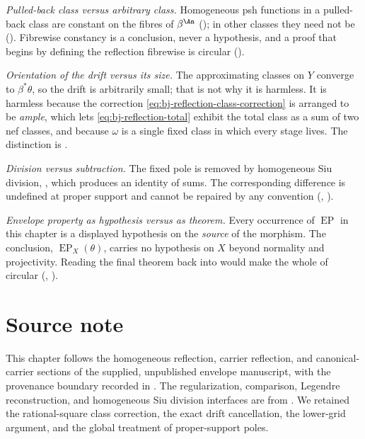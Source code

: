 \emph{Pulled-back class versus arbitrary class.}  Homogeneous psh functions
in a pulled-back class are constant on the fibres of $\beta^{\An}$
(); in other classes they need not be
().  Fibrewise constancy is a conclusion,
never a hypothesis, and a proof that begins by defining the reflection
fibrewise is circular ().

\emph{Orientation of the drift versus its size.}  The approximating classes
on $Y$ converge to $\beta^*\theta$, so the drift is arbitrarily small;
that is not why it is harmless.  It is harmless because the correction
\eqref{eq:bj-reflection-class-correction} is arranged to be \emph{ample},
which lets \eqref{eq:bj-reflection-total} exhibit the total class as a sum
of two nef classes, and because $\omega$ is a single fixed class in which
every stage lives.  The distinction is
.

\emph{Division versus subtraction.}  The fixed pole is removed by
homogeneous Siu division, , which
produces an identity of sums.  The corresponding difference is undefined at
proper support and cannot be repaired by any convention
(, ).

\emph{Envelope property as hypothesis versus as theorem.}  Every occurrence
of $\operatorname{EP}$ in this chapter is a displayed hypothesis on the
\emph{source} of the morphism.  The conclusion,
$\operatorname{EP}_X(\theta)$, carries no hypothesis on $X$ beyond
normality and projectivity.  Reading the final theorem
 back into
 would make the whole of
circular (, ).

\section{Source note}

This chapter follows the homogeneous reflection, carrier reflection, and
canonical-carrier sections of the supplied, unpublished envelope
manuscript, with the provenance boundary recorded in
.  The
regularization, comparison, Legendre reconstruction, and homogeneous Siu
division interfaces are from \cite{BJ22}.  We retained the rational-square
class correction, the exact drift cancellation, the lower-grid argument,
and the global treatment of proper-support poles.


